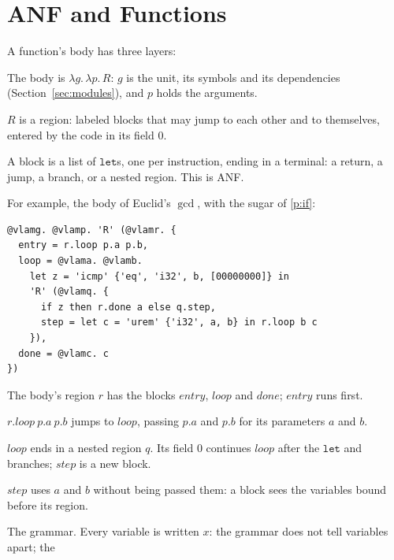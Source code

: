 \documentclass[11pt,letterpaper]{article}
\newcommand{\lam}[2]{\lambda #1.\,#2}       %
\newcommand{\kw}[1]{\mathtt{#1}}
\newcommand{\pref}[1]{\ref{#1}}  %
\begin{document}

\section{ANF and Functions}\label{sec:banf}

\begin{points}
\item\label{p:definition} A function's body has three layers:
  \begin{subpoints}
  \item The body is $\lam{g}{\lam{p}{R}}$: $g$ is the unit, its symbols and its dependencies (Section~\ref{sec:modules}),
    and $p$ holds the arguments.
  \item $R$ is a region: labeled blocks that may jump to each other and to themselves, entered by the code in
    its field $0$.
  \item A block is a list of $\kw{let}$s, one per instruction, ending in a terminal: a return, a jump, a branch, or a
    nested region. This is ANF.
  \end{subpoints}
\item\label{p:gcd-body} For example, the body of Euclid's $\gcd$, with the sugar of \pref{p:if}:
  \begin{Verbatim}[commandchars=\@\<\>, xleftmargin=2em]
@vlamg. @vlamp. 'R' (@vlamr. {
  entry = r.loop p.a p.b,
  loop = @vlama. @vlamb.
    let z = 'icmp' {'eq', 'i32', b, [00000000]} in
    'R' (@vlamq. {
      if z then r.done a else q.step,
      step = let c = 'urem' {'i32', a, b} in r.loop b c
    }),
  done = @vlamc. c
})
\end{Verbatim}
  \begin{subpoints}
  \item The body's region $r$ has the blocks $\mathit{entry}$, $\mathit{loop}$ and $\mathit{done}$; $\mathit{entry}$ runs first.
  \item $r.\mathit{loop}\ p.a\ p.b$ jumps to $\mathit{loop}$, passing $p.a$ and $p.b$ for its parameters $a$ and $b$.
  \item $\mathit{loop}$ ends in a nested region $q$. Its field $0$ continues $\mathit{loop}$ after the $\kw{let}$ and branches; $\mathit{step}$ is a
    new block.
  \item $\mathit{step}$ uses $a$ and $b$ without being passed them: a block sees the variables bound before its region.
  \end{subpoints}
\item\label{p:anf} The grammar. Every variable is written $x$: the grammar does not tell variables apart; the

\end{points}
\end{document}
